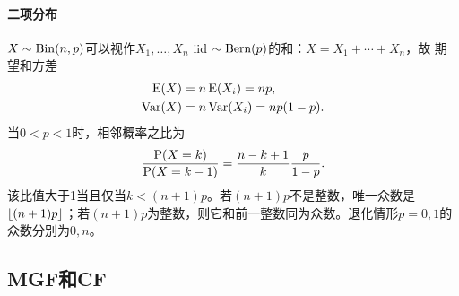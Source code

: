 \paragraph{二项分布}

$X \sim \BinDist(n,p)$可以视作$X_1,\ldots,X_n$ iid $\sim \BernDist(p)$的和：$X = X_1 + \cdots + X_n$，故
期望和方差
\begin{subequations}
	\begin{align}
		\E(X) &= n\E(X_i) = np,\\
		\Var(X) &= n\Var(X_i) = np(1 - p).
	\end{align}
\end{subequations}
当$0 < p < 1$时，相邻概率之比为
\[
	\frac{\P(X = k)}{\P(X = k - 1)} = \frac{n - k + 1}{k}\frac p{1 - p}.
\]
该比值大于1当且仅当$k < (n + 1)p$。若$(n + 1)p$不是整数，唯一众数是$\floor{(n + 1)p}$；若$(n + 1)p$为整数，则它和前一整数同为众数。退化情形$p = 0,1$的众数分别为$0,n$。






\subsection{MGF和CF}

